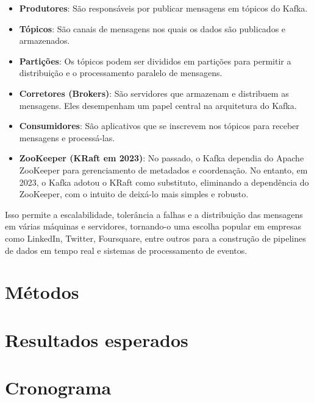 \begin{itemize}
  \item \textbf{Produtores}: São responsáveis por publicar mensagens em tópicos do Kafka.
  \item \textbf{Tópicos}: São canais de mensagens nos quais os dados são publicados e armazenados.
  \item \textbf{Partições}: Os tópicos podem ser divididos em partições para permitir a distribuição e o processamento paralelo de mensagens.
  \item \textbf{Corretores (Brokers)}: São servidores que armazenam e distribuem as mensagens. Eles desempenham um papel central na arquitetura do Kafka.
  \item \textbf{Consumidores}: São aplicativos que se inscrevem nos tópicos para receber mensagens e processá-las.
  \item \textbf{ZooKeeper (KRaft em 2023)}: No passado, o Kafka dependia do Apache ZooKeeper para gerenciamento de metadados e coordenação. No entanto, em 2023, o Kafka adotou o KRaft como substituto, eliminando a dependência do ZooKeeper, com o intuito de deixá-lo mais simples e robusto.
\end{itemize}
Isso permite a escalabilidade, tolerância a falhas e a distribuição das mensagens em várias máquinas e servidores, tornando-o uma escolha popular em empresas como LinkedIn, Twitter, Foursquare, entre outros para a construção de pipelines de dados em tempo real e sistemas de processamento de eventos.

\section{Métodos}\label{sec:metodo}

\section{Resultados esperados}


\section{Cronograma}
